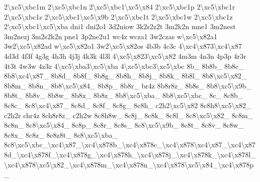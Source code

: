 {2\textbackslash{}xc5\textbackslash{}xbc1m 2\textbackslash{}xc5\textbackslash{}xbc1n 2\textbackslash{}xc5\textbackslash{}xbc1\textbackslash{}xc5\textbackslash{}x84 2\textbackslash{}xc5\textbackslash{}xbc1p 2\textbackslash{}xc5\textbackslash{}xbc1r 2\textbackslash{}xc5\textbackslash{}xbc1s 2\textbackslash{}xc5\textbackslash{}xbc1\textbackslash{}xc5\textbackslash{}x9b 2\textbackslash{}xc5\textbackslash{}xbc1t 2\textbackslash{}xc5\textbackslash{}xbc1w 2\textbackslash{}xc5\textbackslash{}xbc1z 2\textbackslash{}xc5\textbackslash{}xbc1\textbackslash{}xc5\textbackslash{}xba dni1 dni2o1 3d2niow 3k2s2z2t 3m2k2n mne1 3m2nest 3m2nezj 3m2s2k2n pne1 3p2ne2u1 wc4z wcza1 3w2czas w\textbackslash{}xc5\textbackslash{}x82a1 3w2\textbackslash{}xc5\textbackslash{}x82ad w\textbackslash{}xc5\textbackslash{}x82o1 3w2\textbackslash{}xc5\textbackslash{}x82os 4b3b 4c3c 4\textbackslash{}xc4\textbackslash{}x873\textbackslash{}xc4\textbackslash{}x87 4d3d 4f3f 4g3g 4h3h 4j3j 4k3k 4l3l 4\textbackslash{}xc5\textbackslash{}x823\textbackslash{}xc5\textbackslash{}x82 4m3m 4n3n 4p3p 4r3r 4t3t 4w3w 4z3z 4\textbackslash{}xc5\textbackslash{}xba3\textbackslash{}xc5\textbackslash{}xba 4\textbackslash{}xc5\textbackslash{}xbc3\textbackslash{}xc5\textbackslash{}xbc 8b\-\_\- 8b8b\-\_\- 8b8c\-\_\- 8b8\textbackslash{}xc4\textbackslash{}x87\-\_\- 8b8d\-\_\- 8b8f\-\_\- 8b8g\-\_\- 8b8h\-\_\- 8b8j\-\_\- 8b8k\-\_\- 8b8l\-\_\- 8b8\textbackslash{}xc5\textbackslash{}x82\-\_\- 8b8m\-\_\- 8b8n\-\_\- 8b8\textbackslash{}xc5\textbackslash{}x84\-\_\- 8b8p\-\_\- 8b8r\-\_\- br4z 8b8r8z\-\_\- 8b8s\-\_\- 8b8\textbackslash{}xc5\textbackslash{}x9b\-\_\- 8b8t\-\_\- 8b8v\-\_\- 8b8w\-\_\- 8b8x\-\_\- 8b8z\-\_\- 8b8\textbackslash{}xc5\textbackslash{}xba\-\_\- 8b8\textbackslash{}xc5\textbackslash{}xbc\-\_\- 8c\-\_\- 8c8b\-\_\- 8c8c\-\_\- 8c8\textbackslash{}xc4\textbackslash{}x87\-\_\- 8c8d\-\_\- 8c8f\-\_\- 8c8g\-\_\- 8c8h\-\_\- c2h2\textbackslash{}xc5\textbackslash{}x82 8c8h8\textbackslash{}xc5\textbackslash{}x82\-\_\- c2h2r chr4z 8ch8r8z\-\_\- c2h2w 8c8h8w\-\_\- 8c8j\-\_\- 8c8k\-\_\- 8c8l\-\_\- 8c8\textbackslash{}xc5\textbackslash{}x82\-\_\- 8c8m\-\_\- 8c8n\-\_\- 8c8\textbackslash{}xc5\textbackslash{}x84\-\_\- 8c8p\-\_\- 8c8r\-\_\- 8c8s\-\_\- 8c8\textbackslash{}xc5\textbackslash{}x9b\-\_\- 8c8t\-\_\- 8c8v\-\_\- 8c8w\-\_\- 8c8x\-\_\- 8c8z\-\_\- 8c8z8t\-\_\- 8c8\textbackslash{}xc5\textbackslash{}xba\-\_\- 8c8\textbackslash{}xc5\textbackslash{}xbc\-\_\textbackslash{}xc4\textbackslash{}x87\-\_\textbackslash{}xc4\textbackslash{}x878b\-\_\textbackslash{}xc4\textbackslash{}x878c\-\_\textbackslash{}xc4\textbackslash{}x878\textbackslash{}xc4\textbackslash{}x87\-\_\textbackslash{}xc4\textbackslash{}x878d\-\_\textbackslash{}xc4\textbackslash{}x878f\-\_\textbackslash{}xc4\textbackslash{}x878g\-\_\textbackslash{}xc4\textbackslash{}x878h\-\_\textbackslash{}xc4\textbackslash{}x878j\-\_\textbackslash{}xc4\textbackslash{}x878k\-\_\textbackslash{}xc4\textbackslash{}x878l\-\_\textbackslash{}xc4\textbackslash{}x878\textbackslash{}xc5\textbackslash{}x82\-\_\textbackslash{}xc4\textbackslash{}x878m\-\_\textbackslash{}xc4\textbackslash{}x878n\-\_\textbackslash{}xc4\textbackslash{}x878\textbackslash{}xc5\textbackslash{}x84\-\_\textbackslash{}xc4\textbackslash{}x878p\-\_\- }

